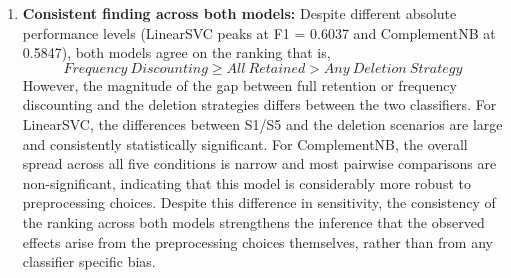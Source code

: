 \documentclass[a4paper,10pt]{article}
\begin{document}
\begin{enumerate}
    \item \textbf{Consistent finding across both models:}
    Despite different absolute performance levels (LinearSVC peaks at F1 = 0.6037 and ComplementNB at 0.5847), both models agree on the ranking that is, \[Frequency \ Discounting \geq All \ Retained > Any \ Deletion \ Strategy\]
    However, the magnitude of the gap between full retention or frequency discounting and the deletion strategies differs between the two classifiers. For LinearSVC, the differences between S1/S5 and the deletion scenarios are large and consistently statistically significant. For ComplementNB, the overall spread across all five conditions is narrow and most pairwise comparisons are non-significant, indicating that this model is considerably more robust to preprocessing choices. Despite this difference in sensitivity, the consistency of the ranking across both models strengthens the inference that the observed effects arise from the preprocessing choices themselves, rather than from any classifier specific bias.

\end{enumerate}
\end{document}
